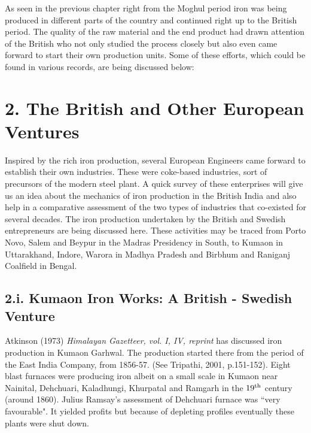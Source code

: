 As seen in the previous chapter right from the Moghul period iron was being produced in different parts of the country and continued right up to the British period. The quality of the raw material and the end product had drawn attention of the British who not only studied the process closely but also even came forward to start their own production units. Some of these efforts, which could be found in various records, are being discussed below:

\vspace{-.3cm}

\section*{2.  The British and Other European Ventures}\label{chapter6-section-4a}

\vspace{-.2cm}

Inspired by the rich iron production, several European Engineers came forward to establish their own industries. These were coke-based industries, sort of precursors of the modern steel plant. A quick survey of these enterprises will give us an idea about the mechanics of iron production in the British India and also help in a comparative assessment of the two types of industries that co-existed for several decades. The iron production undertaken by the British and Swedish entrepreneurs are being discussed here. These activities may be traced from Porto Novo, Salem and Beypur in the Madras Presidency in South, to Kumaon in Uttarakhand, Indore, Warora in Madhya Pradesh and Birbhum and Raniganj Coalfield in Bengal.

\vspace{-.3cm}

\subsection*{2.i. Kumaon Iron Works: A British - Swedish Venture}

\vspace{-.2cm}

Atkinson (1973) {\it Himalayan Gazetteer, vol. I, IV, reprint} has discussed iron production in Kumaon Garhwal.  The production started there from the period of the East India Company, from 1856-57. (See Tripathi, 2001, p.151-152). Eight blast furnaces were producing iron albeit on a small scale in Kumaon near Nainital, Dehchuari, Kaladhungi, Khurpatal and Ramgarh in the $19^{\rm th}$ century (around 1860). Julius Ramsay's assessment of Dehchuari furnace was ``very favourable". It yielded profits but because of depleting profiles eventually these plants were shut down.

